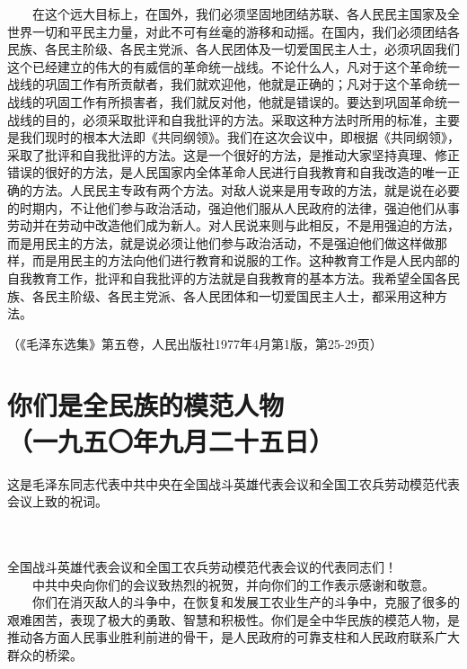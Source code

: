 \documentclass[cn,11pt,chinese]{elegantbook}
\def\myformat#1{\hfil\hfil #1}
\begin{document}
　　在这个远大目标上，在国外，我们必须坚固地团结苏联、各人民民主国家及全世界一切和平民主力量，对此不可有丝毫的游移和动摇。在国内，我们必须团结各民族、各民主阶级、各民主党派、各人民团体及一切爱国民主人士，必须巩固我们这个已经建立的伟大的有威信的革命统一战线。不论什么人，凡对于这个革命统一战线的巩固工作有所贡献者，我们就欢迎他，他就是正确的；凡对于这个革命统一战线的巩固工作有所损害者，我们就反对他，他就是错误的。要达到巩固革命统一战线的目的，必须采取批评和自我批评的方法。采取这种方法时所用的标准，主要是我们现时的根本大法即《共同纲领》。我们在这次会议中，即根据《共同纲领》，采取了批评和自我批评的方法。这是一个很好的方法，是推动大家坚持真理、修正错误的很好的方法，是人民国家内全体革命人民进行自我教育和自我改造的唯一正确的方法。人民民主专政有两个方法。对敌人说来是用专政的方法，就是说在必要的时期内，不让他们参与政治活动，强迫他们服从人民政府的法律，强迫他们从事劳动并在劳动中改造他们成为新人。对人民说来则与此相反，不是用强迫的方法，而是用民主的方法，就是说必须让他们参与政治活动，不是强迫他们做这样做那样，而是用民主的方法向他们进行教育和说服的工作。这种教育工作是人民内部的自我教育工作，批评和自我批评的方法就是自我教育的基本方法。我希望全国各民族、各民主阶级、各民主党派、各人民团体和一切爱国民主人士，都采用这种方法。\\
\begin{flushright}（《毛泽东选集》第五卷，人民出版社1977年4月第1版，第25-29页）\end{flushright}
\newpage\section*{\myformat{你们是全民族的模范人物}\\\myformat{（一九五〇年九月二十五日）}}
\begin{introduction}\item  这是毛泽东同志代表中共中央在全国战斗英雄代表会议和全国工农兵劳动模范代表会议上致的祝词。\end{introduction}\\~\\
全国战斗英雄代表会议和全国工农兵劳动模范代表会议的代表同志们！\\
　　中共中央向你们的会议致热烈的祝贺，并向你们的工作表示感谢和敬意。\\
　　你们在消灭敌人的斗争中，在恢复和发展工农业生产的斗争中，克服了很多的艰难困苦，表现了极大的勇敢、智慧和积极性。你们是全中华民族的模范人物，是推动各方面人民事业胜利前进的骨干，是人民政府的可靠支柱和人民政府联系广大群众的桥梁。\\
\end{document}

